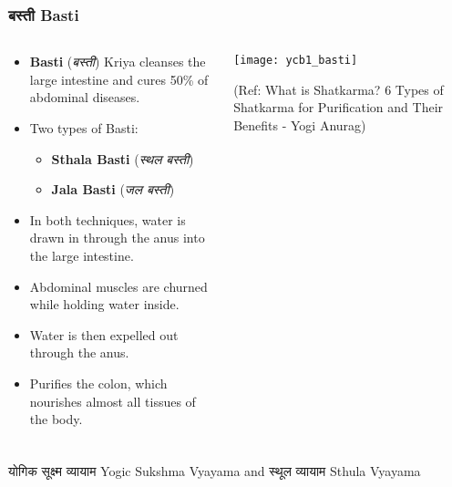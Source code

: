 \begin{frame}[fragile]\frametitle{बस्ती Basti}
\begin{columns}
    \begin{column}[T]{0.5\linewidth}
      \begin{itemize}
          \item \textbf{Basti} (\textit{बस्ती}) Kriya cleanses the large intestine and cures 50\% of abdominal diseases.
          \item Two types of Basti:
            \begin{itemize}
              \item \textbf{Sthala Basti} (\textit{स्थल बस्ती})
              \item \textbf{Jala Basti} (\textit{जल बस्ती})
            \end{itemize}
          \item In both techniques, water is drawn in through the anus into the large intestine.
          \item Abdominal muscles are churned while holding water inside.
          \item Water is then expelled out through the anus.
          \item Purifies the colon, which nourishes almost all tissues of the body.
      \end{itemize}
    \end{column}
    \begin{column}[T]{0.5\linewidth}
        \begin{center}
        \texttt{[image: ycb1\_basti]}
		
		{\tiny (Ref: What is Shatkarma? 6 Types of Shatkarma for Purification and Their Benefits - Yogi Anurag)}	
        \end{center}	
    \end{column}
\end{columns}	  
\end{frame}


\begin{frame}[fragile]\frametitle{}
\begin{center}
{\Large योगिक सूक्ष्म व्यायाम  Yogic Sukshma Vyayama and स्थूल व्यायाम Sthula Vyayama}
\end{center}
\end{frame}


